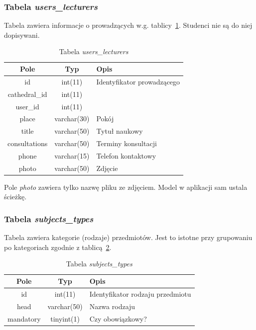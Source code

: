 \documentclass[a4paper,12pt,oneside]{report}
\begin{document}
\newpage
\subsubsection{Tabela \emph{users\_lecturers}}
\label{subsub:users_lecturers}
Tabela zawiera informacje o prowadzących w.g. tablicy~\ref{tab:users_lecturers}. Studenci nie są do niej dopisywani.

\begin{table}[h]
  \centering
  \begin{tabular}{|c|c|l|}\hline
  Pole & Typ & Opis \\\hline
  id            & int(11)     & Identyfikator prowadzącego\\
  cathedral\_id & int(11)     & \\
  user\_id      & int(11)     & \\
  place         & varchar(30) & Pokój \\
  title         & varchar(50) & Tytuł naukowy \\
  consultations & varchar(50) & Terminy konsultacji \\
  phone         & varchar(15) & Telefon kontaktowy \\
  photo         & varchar(50) & Zdjęcie \\\hline
  \end{tabular}
  \caption{Tabela \emph{users\_lecturers}\label{tab:users_lecturers}}
\end{table}
Pole \emph{photo} zawiera tylko nazwę pliku ze zdjęciem. Model w aplikacji sam ustala ścieżkę.

\subsubsection{Tabela \emph{subjects\_types}}
\label{subsub:subjects_types}
Tabela zawiera kategorie (rodzaje) przedmiotów. Jest to istotne przy grupowaniu po kategoriach zgodnie z tablicą~\ref{tab:subjects_types}.

\begin{table}[h]
  \centering
  \begin{tabular}{|c|c|l|}\hline
  Pole & Typ & Opis \\\hline
  id        & int(11)     & Identyfikator rodzaju przedmiotu \\
  head      & varchar(50) & Nazwa rodzaju \\
  mandatory & tinyint(1)  & Czy obowiązkowy? \\\hline
  \end{tabular}
  \caption{Tabela \emph{subjects\_types}\label{tab:subjects_types}}
\end{table}
\end{document}
